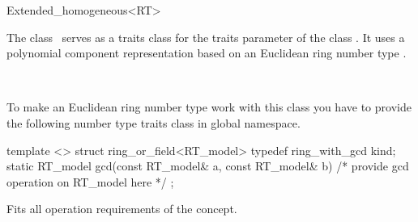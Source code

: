 
\ccAutoIndexingOff
\begin{ccRefClass}{Extended_homogeneous<RT>}
\ccAutoIndexingOn
{}

\ccDefinition
  
The class \ccRefName\ serves as a traits class for the traits
parameter  of the class .  It
uses a polynomial component representation based on an Euclidean ring
number type . 


\ccIsModel

%
 \\

\ccCreation
{}  %



To make an Euclidean ring number type
 work with this class you have to provide the following
number type traits class in global namespace.

\begin{ccExampleCode}
template <>
struct ring_or_field<RT_model> {
  typedef ring_with_gcd kind;
  static RT_model gcd(const RT_model& a, const RT_model& b) 
  { /* provide gcd operation on RT_model here */ }
};    
\end{ccExampleCode}

\ccOperations

Fits all operation requirements of the concept.

\ccSeeAlso

 \\


\ccIndexTraitsClassEnd
\ccAutoIndexingOff
\end{ccRefClass}
\ccAutoIndexingOn

